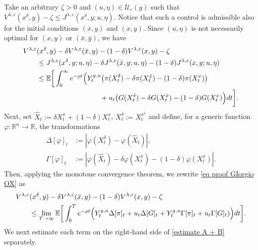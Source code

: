 \documentclass[11pt]{amsart}
\theoremstyle{plain}
\def \dd{{\rm d}}
\numberwithin{equation}{section}
\begin{document}
Take an arbitrary $\zeta>0$ and $(u, \eta) \in \mathcal{U}_\varepsilon(y)$  such that $V^{\lambda, \varepsilon} ( x^\delta, y) -\zeta
 \leq J^{\lambda, \varepsilon}( x^\delta, y; u, \eta)$. 
Notice that such a control is admissible also for the initial conditions $(\bar x, y)$ and $(x,y)$.
Since $(u, \eta)$ is not necessarily optimal for $(x,y)$ or $(\bar{x}, \bar y)$, we have
\begin{equation}\label{eq proof GIorgio OX}
\begin{aligned}
V^{\lambda, \varepsilon}& ( x^\delta, y) - \delta V^{\lambda, \varepsilon}(\bar x,  y) - (1-\delta)V^{\lambda, \varepsilon}( x,y) 
-\zeta \\
& \leq J^{\lambda, \varepsilon}( x^\delta, y; u, \eta) - \delta J^{\lambda, \varepsilon}(\bar x, y;u, \eta) - (1-\delta)J^{\lambda, \varepsilon}( x,y;u, \eta) \\
& \leq \mathbb{E} \bigg[ \int_0^\infty e^{-\rho t} \Big( Y_t^{y,u} \big( \pi (X_t^\delta)  - \delta \pi (X_t^{\bar x}) - (1-\delta) \pi (X_t^{x})  \big) \\
& \quad \quad \quad \quad \quad \quad \quad  \quad \quad 
+ u_t \big( G (X_t^\delta) - \delta G (X_t^{\bar x}) - (1-\delta) G (X_t^{x})  \Big)  \dd t \bigg].
\end{aligned}
\end{equation}
Next, set $\hat X_t := \delta  X^{\bar x}_t  + (1-\delta) X^x_t$, $X^\delta_t:= X^{x^\delta}_t$ and define, for a generic function $\varphi: \mathbb R ^n \to \mathbb R$, the transformations 
$$
\begin{aligned}
    \Delta [\varphi] _t & := |\varphi (X_t^\delta)  - \varphi(\hat X_t)|, \\
    \Gamma [\varphi] _t & :=  |\varphi(\hat X_t) - \delta \varphi (X_t^{\bar x}) - (1-\delta) \varphi (X_t^{x})|.
\end{aligned}
$$
Then, applying the monotone convergence theorem, we rewrite \eqref{eq proof GIorgio OX} as 
\begin{equation}\label{estimate A + B}
\begin{aligned} 
V^{\lambda, \varepsilon}& ( x^\delta, y) - \delta V^{\lambda, \varepsilon}(\bar x,  y) - (1-\delta)V^{\lambda, \varepsilon}( x,y) 
-\zeta \\
& \leq  \lim_{T \to \infty} \mathbb{E} \bigg[ \int_0^T e^{-\rho t} \Big( Y_t^{y,u} \Delta [\pi] _t + u_t \Delta [G] _t   + Y_t^{y,u} \Gamma [\pi] _t + u_t \Gamma [G]_t) \Big) \dd t\bigg].
\end{aligned}
\end{equation}
We next estimate each term on the right-hand side of \eqref{estimate A + B} separately.
\end{document}
